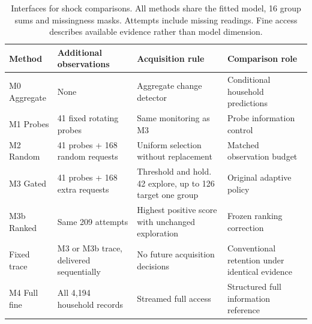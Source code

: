 \documentclass{article}
\begin{document}
\begin{table}[!t]
\caption{Interfaces for shock comparisons. All methods share the fitted model, 16 group sums and missingness masks. Attempts include missing readings. Fine access describes available evidence rather than model dimension.}
\label{tab:methods}\centering
\begin{tabular}{p{}p{}p{}p{}}
\toprule
Method & Additional observations & Acquisition rule & Comparison role\\
\midrule
M0 Aggregate & None & Aggregate change detector & Conditional household predictions\\
M1 Probes & 41 fixed rotating probes & Same monitoring as M3 & Probe information control\\
M2 Random & 41 probes + 168 random requests & Uniform selection without replacement & Matched observation budget\\
M3 Gated & 41 probes + 168 extra requests & Threshold and hold. 42 explore, up to 126 target one group & Original adaptive policy\\
M3b Ranked & Same 209 attempts & Highest positive score with unchanged exploration & Frozen ranking correction\\
Fixed trace & M3 or M3b trace, delivered sequentially & No future acquisition decisions & Conventional retention under identical evidence\\
M4 Full fine & All 4,194 household records & Streamed full access & Structured full information reference\\
\bottomrule
\end{tabular}
\end{table}
\end{document}
